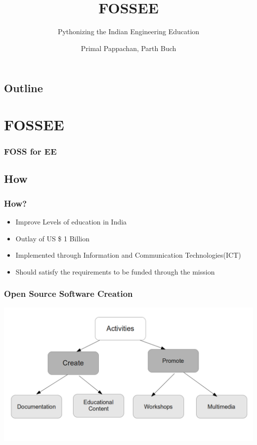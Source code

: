 \documentclass[compress,red]{beamer} %
\title{FOSSEE}
\subtitle{Pythonizing the Indian Engineering Education}
\author[]{Primal Pappachan, Parth Buch}  %
\institute{IIT Bombay}
\date[]{} %
\begin{document}
\begin{frame}
	 \titlepage
\end{frame}

\begin{frame}
\section*{Outline}
\tableofcontents
\end{frame}

\section{FOSSEE}
\begin{frame}
\frametitle{FOSS for EE}
\end{frame}

\subsection{How}
\begin{frame}
\frametitle{How?}
\begin{itemize}
\item Improve Levels of education in India
\item Outlay of US \$ 1 Billion
\item Implemented through Information and Communication Technologies(ICT)
\item Should satisfy the requirements to be funded through the mission
\end{itemize}
\end{frame}


\begin{frame}
\frametitle{Open Source Software Creation}
\includegraphics[scale=.30]{tree.png}
\end{frame}
\end{document}
